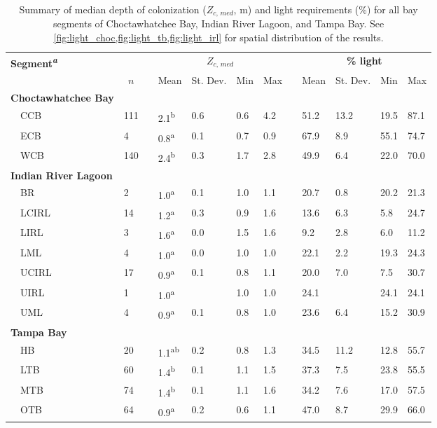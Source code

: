 \documentclass[letterpaper,12pt,oneside]{article}\usepackage[]{graphicx}\usepackage[]{color}
\begin{document}
\begin{table}[!tbp]
{\small
\caption{Summary of median depth of colonization ($Z_{c,\,med}$, m) and light requirements (\%) for all bay segments of Choctawhatchee Bay, Indian River Lagoon, and Tampa Bay.  See \cref{fig:light_choc,fig:light_tb,fig:light_irl} for spatial distribution of the results.\label{tab:light_summ}} 
\begin{center}
\begin{tabular}{llcllllcllll}
\hline\hline
\multicolumn{1}{l}{\bfseries Segment\textsuperscript{\textit{a}}}&\multicolumn{1}{c}{\bfseries }&\multicolumn{1}{c}{\bfseries }&\multicolumn{4}{c}{\bfseries {\bf $Z_{c,\,med}$}}&\multicolumn{1}{c}{\bfseries }&\multicolumn{4}{c}{\bfseries \% light}\tabularnewline
\cline{4-7} \cline{9-12}
\multicolumn{1}{l}{}&\multicolumn{1}{c}{$n$}&\multicolumn{1}{c}{}&\multicolumn{1}{c}{Mean}&\multicolumn{1}{c}{St. Dev.}&\multicolumn{1}{c}{Min}&\multicolumn{1}{c}{Max}&\multicolumn{1}{c}{}&\multicolumn{1}{c}{Mean}&\multicolumn{1}{c}{St. Dev.}&\multicolumn{1}{c}{Min}&\multicolumn{1}{c}{Max}\tabularnewline
\hline
{\bfseries Choctawhatchee Bay}&&&&&&&&&&&\tabularnewline
~~CCB&111&&2.1\textsuperscript{b}&0.6&0.6&4.2&&51.2&13.2&19.5&87.1\tabularnewline
~~ECB&4&&0.8\textsuperscript{a}&0.1&0.7&0.9&&67.9& 8.9&55.1&74.7\tabularnewline
~~WCB&140&&2.4\textsuperscript{b}&0.3&1.7&2.8&&49.9& 6.4&22.0&70.0\tabularnewline
\hline
{\bfseries Indian River Lagoon}&&&&&&&&&&&\tabularnewline
~~BR&2&&1.0\textsuperscript{a}&0.1&1.0&1.1&&20.7& 0.8&20.2&21.3\tabularnewline
~~LCIRL&14&&1.2\textsuperscript{a}&0.3&0.9&1.6&&13.6& 6.3& 5.8&24.7\tabularnewline
~~LIRL&3&&1.6\textsuperscript{a}&0.0&1.5&1.6&& 9.2& 2.8& 6.0&11.2\tabularnewline
~~LML&4&&1.0\textsuperscript{a}&0.0&1.0&1.0&&22.1& 2.2&19.3&24.3\tabularnewline
~~UCIRL&17&&0.9\textsuperscript{a}&0.1&0.8&1.1&&20.0& 7.0& 7.5&30.7\tabularnewline
~~UIRL&1&&1.0\textsuperscript{a}& &1.0&1.0&&24.1& &24.1&24.1\tabularnewline
~~UML&4&&0.9\textsuperscript{a}&0.1&0.8&1.0&&23.6& 6.4&15.2&30.9\tabularnewline
\hline
{\bfseries Tampa Bay}&&&&&&&&&&&\tabularnewline
~~HB&20&&1.1\textsuperscript{ab}&0.2&0.8&1.3&&34.5&11.2&12.8&55.7\tabularnewline
~~LTB&60&&1.4\textsuperscript{b}&0.1&1.1&1.5&&37.3& 7.5&23.8&55.5\tabularnewline
~~MTB&74&&1.4\textsuperscript{b}&0.1&1.1&1.6&&34.2& 7.6&17.0&57.5\tabularnewline
~~OTB&64&&0.9\textsuperscript{a}&0.2&0.6&1.1&&47.0& 8.7&29.9&66.0\tabularnewline
\hline
\end{tabular}\end{center}}


\end{table}
\end{document}
